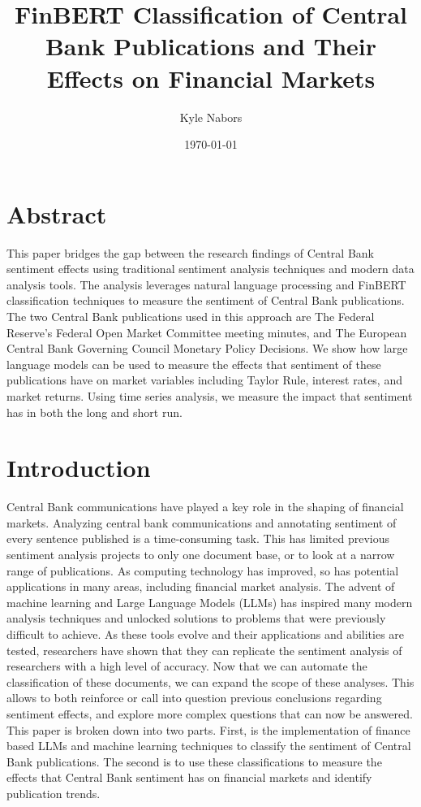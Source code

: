 \documentclass[12pt, letterpaper]{article}
\begin{document}
\title{FinBERT Classification of Central Bank Publications and Their Effects on Financial Markets}
\author{Kyle Nabors}

\date{\today}

\maketitle

\section{Abstract}
This paper bridges the gap between the research findings of Central Bank sentiment effects using traditional sentiment analysis techniques and modern data analysis tools. The analysis leverages natural language processing and FinBERT classification techniques to measure the sentiment of Central Bank publications. The two Central Bank publications used in this approach are The Federal Reserve's Federal Open Market Committee meeting minutes, and The European Central Bank Governing Council Monetary Policy Decisions. We show how large language models can be used to measure the effects that sentiment of these publications have on market variables including Taylor Rule, interest rates, and market returns. Using time series analysis, we measure the impact that sentiment has in both the long and short run. 

\section{Introduction}
Central Bank communications have played a key role in the shaping of financial markets. Analyzing central bank communications and annotating sentiment of every sentence published is a time-consuming task. This has limited previous sentiment analysis projects to only one document base, or to look at a narrow range of publications. As computing technology has improved, so has potential applications in many areas, including financial market analysis. The advent of machine learning and Large Language Models (LLMs) has inspired many modern analysis techniques and unlocked solutions to problems that were previously difficult to achieve. As these tools evolve and their applications and abilities are tested, researchers have shown that they can replicate the sentiment analysis of researchers with a high level of accuracy. Now that we can automate the classification of these documents, we can expand the scope of these analyses. This allows to both reinforce or call into question previous conclusions regarding sentiment effects, and explore more complex questions that can now be answered.  This paper is broken down into two parts. First, is the implementation of finance based LLMs and machine learning techniques to classify the sentiment of Central Bank publications. The second is to use these classifications to measure the effects that Central Bank sentiment has on financial markets and identify publication trends. 
\end{document}
